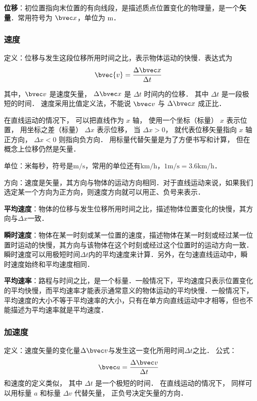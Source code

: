 \textbf{位移}：初位置指向末位置的有向线段，是描述质点位置变化的物理量，是一个\textbf{矢量}．常用符号为 $\bvec x$，单位为 $\mathrm{m}$．

\subsubsection{速度}
定义：位移与发生这段位移所用时间之比，表示物体运动的快慢．表达式为
\begin{equation}\label{HSPM01_eq3}
\bvec{v} = \frac{\Delta \bvec x}{\Delta t}
\end{equation}

其中，$\bvec v$ 是速度矢量， $\Delta \bvec x$ 是 $\Delta t$ 时间内的位移． 其中 $\Delta t$ 是一段极短的时间． 速度采用比值定义法，不能说 $\bvec v$ 与 $\Delta \bvec x$ 成正比．

在直线运动的情况下， 可以把直线作为 $x$ 轴， 使用一个坐标（标量） $x$ 表示位置， 用坐标之差（标量） $\Delta x$ 表示位移， 当 $\Delta x > 0$， 就代表位移矢量指向 $x$ 轴正方向， $\Delta x < 0$ 则指向负方向． 用标量代替矢量是为了方便书写和计算， 但在概念上位移仍然是矢量．

单位：米每秒，符号是$\mathrm{m/s}$，常用的单位还有$\mathrm{km/h}$，$1\mathrm{m/s}=3.6\mathrm{km/h}$．

方向：速度是矢量，其方向与物体的运动方向相同．对于直线运动来说，如果我们选定某一个方向为正方向，则速度方向就可以用正、负号来表示．

\textbf{平均速度}：物体的位移与发生位移所用时间之比，描述物体位置变化的快慢，其方向与$\Delta x$一致．

\textbf{瞬时速度}：物体在某一时刻或某一位置的速度，描述物体在某一时刻或经过某一位置时运动的快慢，其方向与该物体在这个时刻或经过这个位置时的运动方向一致．瞬时速度可以用极短时间$\Delta t$内的平均速度来计算．另外，在匀速直线运动中，瞬时速度始终和平均速度相同．

\textbf{平均速率}：路程与时间之比，是一个标量．一般情况下，平均速度只表示位置变化的平均快慢，而平均速率才能表示通常意义的物体运动的平均快慢．一般情况下，平均速度的大小不等于平均速率的大小，只有在单方向直线运动中才相等，但也不能描述为平均速率就是平均速度．

\subsubsection{加速度}
定义：速度矢量的变化量$\Delta \bvec v$与发生这一变化所用时间$\Delta t$之比．
公式：
\begin{equation}
\bvec a=\frac{\Delta \bvec v}{\Delta t}
\end{equation}
和速度的定义类似， 其中 $\Delta t$ 是一个极短的时间． 在直线运动的情况下， 同样可以用标量 $a$ 和标量 $\Delta v$ 代替矢量， 正负号决定矢量的方向．


